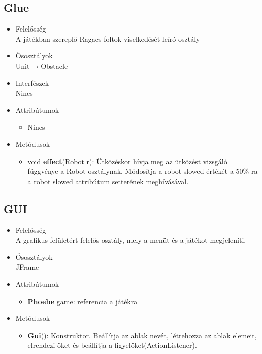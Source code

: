 \subsection{Glue}
\begin{itemize}
\item Felelősség\\
A játékban szereplő Ragacs foltok viselkedését leíró osztály
\item Ősosztályok\\
Unit$\rightarrow$Obstacle
\item Interfészek\\
Nincs
\item Attribútumok
	\begin{itemize}
	   \item  Nincs
\end{itemize}
\item Metódusok
	\begin{itemize}
		\item void \textbf{effect}(Robot r): Ütközéskor hívja meg az ütközést vizsgáló függvénye a Robot osztálynak. Módosítja a robot slowed értékét a 50\%-ra a robot slowed attribútum setterének meghívásával.
	\end{itemize}
\end{itemize}

\subsection{GUI}
\begin{itemize}
\item Felelősség\\
A grafikus felületért felelős osztály, mely a menüt és a játékot megjeleníti.
\item Ősosztályok\\
JFrame
\item Attribútumok
	\begin{itemize}
		\item \textbf{Phoebe} game: referencia a játékra
	\end{itemize}
\item Metódusok
	\begin{itemize}
		\item\textbf{ Gui}(): Konstruktor. Beállítja az ablak nevét, létrehozza az ablak elemeit, elrendezi őket és beállítja a figyelőket(ActionListener).
	\end{itemize}
\end{itemize}

